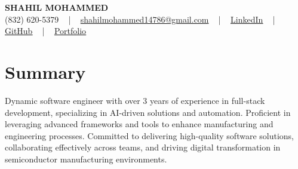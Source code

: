 \documentclass[letterpaper,10pt]{article}
\begin{document}
\begin{center}
    {\fontsize{14pt}{12pt}\selectfont \textbf{\MakeUppercase{Shahil Mohammed}}}\\ \vspace{2pt}
    \fontsize{10pt}{12pt}\selectfont (832) 620-5379 ~ | ~ \href{mailto:shahilmohammed14786@gmail.com}{shahilmohammed14786@gmail.com} ~ | ~  
    \href{https://www.linkedin.com/in/shahil-mohammed-9652931a1/}{\color{blue}\underline{LinkedIn}}  ~ | ~ 
    \href{https://github.com/freakbeast14}{\color{blue}\underline{GitHub}} ~ | ~ 
    \href{https://shahil-mohammed.netlify.app/}{\color{blue}\underline{Portfolio}}
    \vspace{-8pt}
\end{center}

\section{Summary}
\vspace{-2pt}\fontsize{8pt}{9pt}\selectfont
Dynamic software engineer with over 3 years of experience in full-stack development, specializing in AI-driven solutions and automation. Proficient in leveraging advanced frameworks and tools to enhance manufacturing and engineering processes. Committed to delivering high-quality software solutions, collaborating effectively across teams, and driving digital transformation in semiconductor manufacturing environments.
 \vspace{-5pt}
 
\vspace{-2pt}
\end{document}
